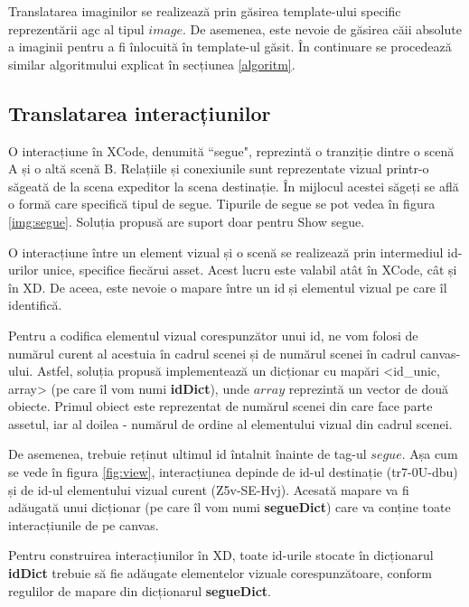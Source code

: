 Translatarea imaginilor se realizează prin găsirea template-ului specific reprezentării agc al tipul $image$. De asemenea, este nevoie de găsirea căii absolute a imaginii pentru a fi înlocuită în template-ul găsit. În continuare se procedează similar algoritmului explicat în secțiunea \ref{algoritm}.

\subsection{Translatarea interacțiunilor}

O interacțiune în XCode, denumită ``segue", reprezintă o tranziție dintre o scenă A și o altă scenă B. Relațiile și conexiunile sunt reprezentate vizual printr-o săgeată de la scena expeditor la scena destinație. În mijlocul acestei săgeți se află o formă care specifică tipul de segue. Tipurile de segue se pot vedea în figura \ref{img:segue}. Soluția propusă are suport doar pentru Show segue.


O interacțiune între un element vizual și o scenă se realizează prin intermediul id-urilor unice, specifice fiecărui asset. Acest lucru este valabil atât în XCode, cât și în XD. De aceea, este nevoie o mapare între un id și elementul vizual pe care îl identifică. 

Pentru a codifica elementul vizual corespunzător unui id, ne vom folosi de numărul curent al acestuia în cadrul scenei și de numărul scenei în cadrul canvas-ului. Astfel, soluția propusă implementează un dicționar cu mapări <id_unic, array> (pe care îl vom numi \textbf{idDict}), unde $array$ reprezintă un vector de două obiecte. Primul obiect este reprezentat de numărul scenei din care face parte assetul, iar al doilea - numărul de ordine al elementului vizual din cadrul scenei.

De asemenea, trebuie reținut ultimul id întalnit înainte de tag-ul $segue$. Așa cum se vede în figura \ref{fig:view}, interacțiunea depinde de id-ul destinație (tr7-0U-dbu) și de id-ul elementului vizual curent (Z5v-SE-Hvj). Acesată mapare va fi adăugată unui dicționar (pe care îl vom numi \textbf{segueDict}) care va conține toate interacțiunile de pe canvas.

Pentru construirea interacțiunilor în XD, toate id-urile stocate în dicționarul \textbf{idDict} trebuie să fie adăugate elementelor vizuale corespunzătoare, conform regulilor de mapare din dicționarul \textbf{segueDict}.

